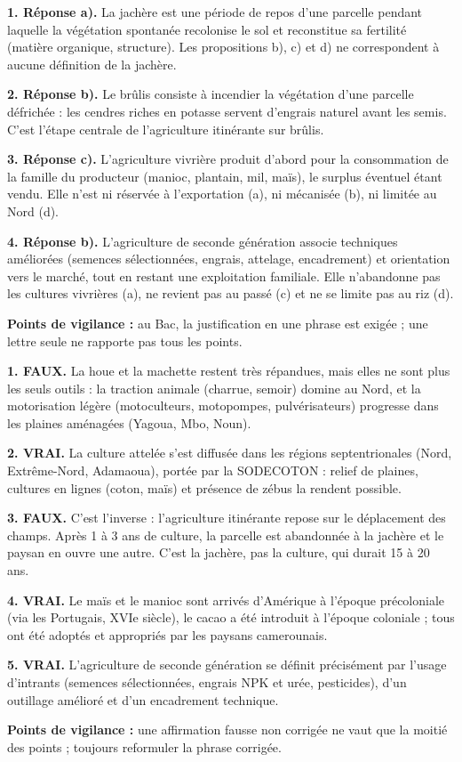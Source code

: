 \documentclass[11pt]{article}
\begin{document}
\begin{corrige}
\textbf{1. Réponse a).} La jachère est une période de repos d'une parcelle pendant laquelle la végétation spontanée recolonise le sol et reconstitue sa fertilité (matière organique, structure). Les propositions b), c) et d) ne correspondent à aucune définition de la jachère.

\textbf{2. Réponse b).} Le brûlis consiste à incendier la végétation d'une parcelle défrichée : les cendres riches en potasse servent d'engrais naturel avant les semis. C'est l'étape centrale de l'agriculture itinérante sur brûlis.

\textbf{3. Réponse c).} L'agriculture vivrière produit d'abord pour la consommation de la famille du producteur (manioc, plantain, mil, maïs), le surplus éventuel étant vendu. Elle n'est ni réservée à l'exportation (a), ni mécanisée (b), ni limitée au Nord (d).

\textbf{4. Réponse b).} L'agriculture de seconde génération associe techniques améliorées (semences sélectionnées, engrais, attelage, encadrement) et orientation vers le marché, tout en restant une exploitation familiale. Elle n'abandonne pas les cultures vivrières (a), ne revient pas au passé (c) et ne se limite pas au riz (d).

\textbf{Points de vigilance :} au Bac, la justification en une phrase est exigée ; une lettre seule ne rapporte pas tous les points.
\end{corrige}

\begin{corrige}
\textbf{1. FAUX.} La houe et la machette restent très répandues, mais elles ne sont plus les seuls outils : la traction animale (charrue, semoir) domine au Nord, et la motorisation légère (motoculteurs, motopompes, pulvérisateurs) progresse dans les plaines aménagées (Yagoua, Mbo, Noun).

\textbf{2. VRAI.} La culture attelée s'est diffusée dans les régions septentrionales (Nord, Extrême-Nord, Adamaoua), portée par la SODECOTON : relief de plaines, cultures en lignes (coton, maïs) et présence de zébus la rendent possible.

\textbf{3. FAUX.} C'est l'inverse : l'agriculture itinérante repose sur le déplacement des champs. Après 1 à 3 ans de culture, la parcelle est abandonnée à la jachère et le paysan en ouvre une autre. C'est la jachère, pas la culture, qui durait 15 à 20 ans.

\textbf{4. VRAI.} Le maïs et le manioc sont arrivés d'Amérique à l'époque précoloniale (via les Portugais, XVIe siècle), le cacao a été introduit à l'époque coloniale ; tous ont été adoptés et appropriés par les paysans camerounais.

\textbf{5. VRAI.} L'agriculture de seconde génération se définit précisément par l'usage d'intrants (semences sélectionnées, engrais NPK et urée, pesticides), d'un outillage amélioré et d'un encadrement technique.

\textbf{Points de vigilance :} une affirmation fausse non corrigée ne vaut que la moitié des points ; toujours reformuler la phrase corrigée.
\end{corrige}
\end{document}

